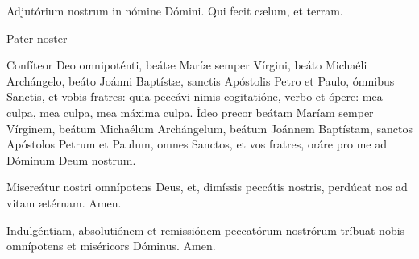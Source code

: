 \documentclass[a4paper, twoside, 12pt]{article}
\begin{document}


\vfill
\pagebreak




\vfill



\vfill

 


\vfill

\noindent \Vbardot{} Adjutórium nostrum in nómine Dómini. \Rbardot{} Qui fecit cælum, et terram.

\vfill

\noindent Pater noster 

\vfill
\pagebreak


\noindent Confíteor Deo omnipoténti, beátæ Maríæ semper Vírgini, beáto
Michaéli Archángelo, beáto Joánni Baptístæ, sanctis Apóstolis Petro
et Paulo, ómnibus Sanctis, et vobis fratres: quia peccávi nimis cogitatióne,
verbo et ópere: mea culpa, mea culpa, mea máxima culpa.
Ídeo precor beátam Maríam semper Vírginem, beátum Michaélum
Archángelum, beátum Joánnem Baptístam, sanctos Apóstolos Petrum
et Paulum, omnes Sanctos, et vos fratres, oráre pro me ad Dóminum
Deum nostrum.

\vfill

\noindent Misereátur nostri omnípotens Deus, et, dimíssis peccátis nostris, perdúcat
nos ad vitam ætérnam. \Rbardot{} Amen.

\vfill

\noindent Indulgéntiam, absolutiónem et remissiónem peccatórum nostrórum tríbuat nobis
omnípotens et miséricors Dóminus. \Rbardot{} Amen.

\vfill


\end{document}
